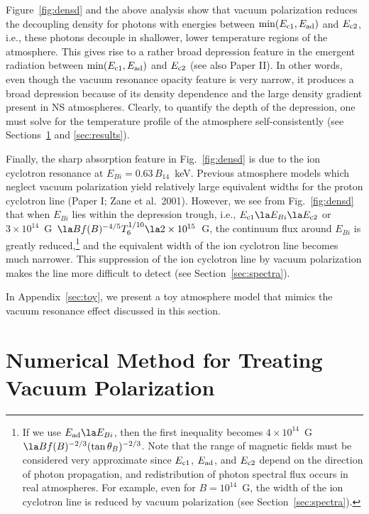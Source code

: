 \documentclass{mn2e}
\newcommand{\etal}{et al.}
\newcommand{\Ebi}{E_{Bi}}
\newcommand{\thetab}{\theta_B}
\newcommand{\holai}{Paper I}
\newcommand{\laiho}{Paper II}
\begin{document}
{Figure~\ref{fig:densd} and the above analysis show that vacuum
polarization reduces the decoupling density for photons with
energies between $\min(E_{\rm c1},E_{\rm ad})$ and $E_{\rm c2}$,
i.e., these photons decouple in shallower, lower temperature
regions of the atmosphere.  This gives rise to a rather broad
depression feature in the emergent radiation between
$\min(E_{\rm c1},E_{\rm ad})$ and $E_{\rm c2}$ (see also \laiho).
In other words, even though the vacuum resonance opacity feature is
very narrow, it produces a broad depression because of its density
dependence and the large density gradient present in NS atmospheres.
Clearly, to quantify the depth of the depression, one must solve
for the temperature profile of the atmosphere self-consistently
(see Sections~\ref{sec:numcomp} and \ref{sec:results}).

Finally, the sharp absorption feature in Fig.~\ref{fig:densd} is due to
the ion cyclotron resonance at $\Ebi=0.63\,B_{14}$~keV.
Previous atmosphere models which neglect vacuum polarization
yield relatively large equivalent widths for the proton
cyclotron line (\holai; Zane \etal~2001).
However, we see from Fig.~\ref{fig:densd} that when $\Ebi$ lies
within the depression trough, i.e.,
$E_{\rm c1}\la\Ebi\la E_{\rm c2}$ or
$3\times 10^{14}$~G~$\la Bf(B)^{-4/5}T_6^{1/10}\la 2\times 10^{15}$~G,
the continuum flux around $\Ebi$ is greatly reduced,\footnote{
If we use $E_{\rm ad}\la \Ebi$, then the first inequality
becomes $4\times 10^{14}$~G~$\la Bf(B)^{-2/3}(\tan\thetab)^{-2/3}$.
Note that the range of
magnetic fields must be considered very approximate since
$E_{\rm c1}$, $E_{\rm ad}$, and $E_{\rm c2}$ depend on the direction
of photon propagation, and redistribution of photon spectral flux
occurs in real atmospheres.  For example, even for $B=10^{14}$~G, the
width of the ion cyclotron line is reduced by vacuum polarization
(see Section~\ref{sec:spectra}).
}
and the equivalent width of the ion cyclotron line becomes much
narrower.
This suppression of the ion cyclotron line by vacuum polarization
makes the line more difficult to detect (see Section~\ref{sec:spectra}).

In Appendix~\ref{sec:toy}, we present a toy atmosphere model that
mimics the vacuum resonance effect discussed in this section.

\section{Numerical Method for Treating Vacuum Polarization}
\label{sec:numcomp}

}
\end{document}
